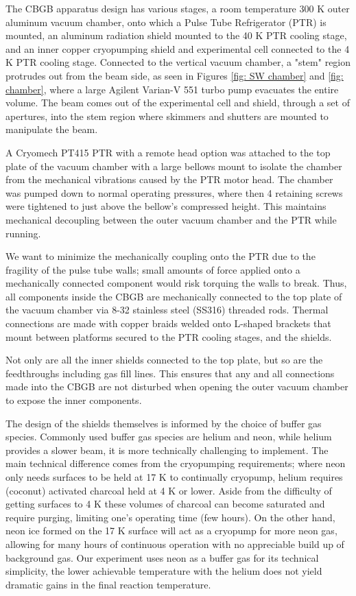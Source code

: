 The CBGB apparatus design has various stages, a room temperature 300 K outer aluminum vacuum chamber, onto which a Pulse Tube Refrigerator (PTR) is mounted, an aluminum radiation shield mounted to the 40 K PTR cooling stage, and an inner copper cryopumping shield and experimental cell connected to the 4 K PTR cooling stage. Connected to the vertical vacuum chamber, a "stem" region protrudes out from the beam side, as seen in Figures \ref{fig: SW chamber} and \ref{fig: chamber}, where a large Agilent Varian-V 551 turbo pump evacuates the entire volume. The beam comes out of the experimental cell and shield, through a set of apertures, into the stem region where skimmers and shutters are mounted to manipulate the beam.

A Cryomech PT415 PTR with a remote head option was attached to the top plate of the vacuum chamber with a large bellows mount to isolate the chamber from the mechanical vibrations caused by the PTR motor head. The chamber was pumped down to normal operating pressures, where then 4 retaining screws were tightened to just above the bellow's compressed height. This maintains mechanical decoupling between the outer vacuum chamber and the PTR while running.

We want to minimize the mechanically coupling onto the PTR due to the fragility of the pulse tube walls; small amounts of force applied onto a mechanically connected component would risk torquing the walls to break. Thus, all components inside the CBGB are mechanically connected to the top plate of the vacuum chamber via 8-32 stainless steel (SS316) threaded rods. Thermal connections are made with copper braids welded onto L-shaped brackets that mount between platforms secured to the PTR cooling stages, and the shields.

Not only are all the inner shields connected to the top plate, but so are the feedthroughs including gas fill lines. This ensures that any and all connections made into the CBGB are not disturbed when opening the outer vacuum chamber to expose the inner components.

The design of the shields themselves is informed by the choice of buffer gas species. Commonly used buffer gas species are helium and neon, while helium provides a slower beam, it is more technically challenging to implement. The main technical difference comes from the cryopumping requirements; where neon only needs surfaces to be held at 17 K to continually cryopump, helium requires (coconut) activated charcoal held at 4 K or lower. Aside from the difficulty of getting surfaces to 4 K these volumes of charcoal can become saturated and require purging, limiting one's operating time (few hours). On the other hand, neon ice formed on the 17 K surface will act as a cryopump for more neon gas, allowing for many hours of continuous operation with no appreciable build up of background gas. Our experiment uses neon as a buffer gas for its technical simplicity, the lower achievable temperature with the helium does not yield dramatic gains in the final reaction temperature.

